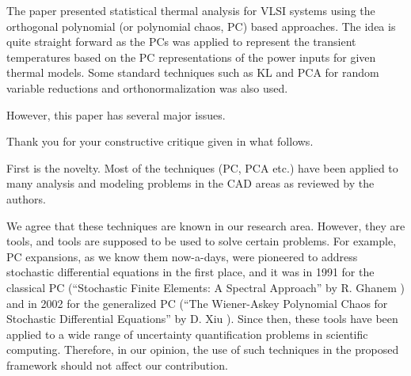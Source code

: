 \begin{reviewer}
The paper presented statistical thermal analysis for VLSI systems using the orthogonal polynomial  (or polynomial chaos, PC) based approaches. The idea is quite straight forward as the PCs was applied to represent the transient temperatures based on the PC representations of the power inputs for given thermal models. Some standard techniques such as KL and PCA for random variable reductions and orthonormalization was also used.

However, this paper has several major issues.
\end{reviewer}
\begin{authors}
Thank you for your constructive critique given in what follows.
\end{authors}

\begin{reviewer}
First is the novelty. Most of the techniques (PC, PCA etc.) have been applied to many analysis and modeling problems in the CAD areas as reviewed by the authors.
\end{reviewer}
\begin{authors}
We agree that these techniques are known in our research area.
However, they are tools, and tools are supposed to be used to solve certain problems.
For example, PC expansions, as we know them now-a-days, were pioneered to address stochastic differential equations in the first place, and it was in 1991 for the classical PC (``Stochastic Finite Elements: A Spectral Approach'' by R. Ghanem \etal) and in 2002 for the generalized PC (``The Wiener-Askey Polynomial Chaos for Stochastic Differential Equations'' by D. Xiu \etal).
Since then, these tools have been applied to a wide range of uncertainty quantification problems in scientific computing.
Therefore, in our opinion, the use of such techniques in the proposed framework should not affect our contribution.
\end{authors}

